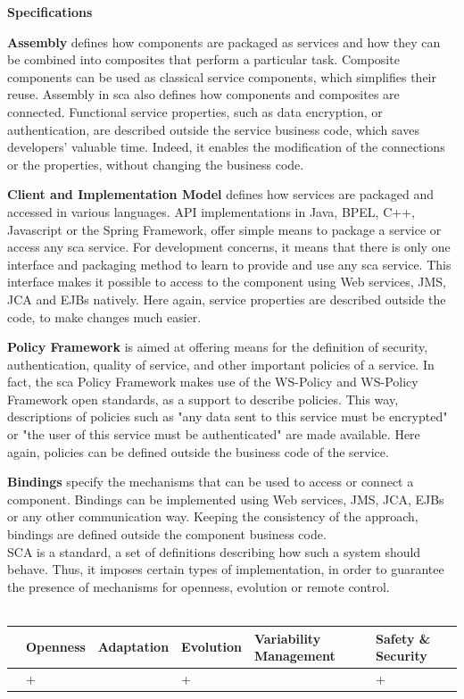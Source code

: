 {\bf Specifications}\\
\par {\bf Assembly} defines how components are packaged as services and how they can be combined into composites that perform a particular task.
Composite components can be used as classical service components, which simplifies their reuse. Assembly in \gls{sca} also defines how components and composites are connected. Functional service properties, such as data encryption, or authentication, are described outside the service business code, which saves developers' valuable time. Indeed, it enables the modification of the connections or the properties, without changing the business code.
\par {\bf Client and Implementation Model} defines how services are packaged and accessed in various languages. API implementations in Java, BPEL, C++, Javascript or the Spring Framework, offer simple means to package a service or access any \gls{sca} service. For development concerns, it means that there is only one interface and packaging method to learn to provide and use any \gls{sca} service. This interface makes it possible to access to the component using Web services, JMS, JCA and EJBs natively. Here again, service properties are described outside the code, to make changes much easier.
\par {\bf Policy Framework} is aimed at offering means for the definition of security, authentication, quality of service, and other important policies of a service. In fact, the \gls{sca} Policy Framework makes use of the WS-Policy and WS-Policy Framework open standards, as a support to describe policies. This way, descriptions of policies such as "any data sent to this service must be encrypted" or "the user of this service must be authenticated" are made available. Here again, policies can be defined outside the business code of the service.
\par {\bf Bindings} specify the mechanisms that can be used to access or connect a component. Bindings can be implemented using Web services, JMS, JCA, EJBs or any other communication way. Keeping the consistency of the approach, bindings are defined outside the component business code.\\

SCA is a standard, a set of definitions describing how such a system should behave. Thus, it imposes certain types of implementation, in order to guarantee the presence of mechanisms for openness, evolution or remote control.\\
\\
\begin{tabular}{ >{\centering}m{}| >{\centering}m{} >{\centering}m{}| >{\centering}m{} >{\centering}m{}| >{\centering\arraybackslash}m{}}
{\tiny Interoperability} & {\tiny Openness} & {\tiny Adaptation} & {\tiny Evolution} & {\tiny Variability Management} & {\tiny Safety \& Security}\\
 \hline
  & + &  & + &  & + \\ 
  \hline
\end{tabular}\\

